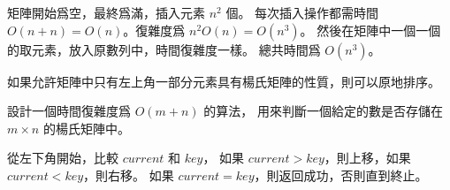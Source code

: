 \startANSWER
矩陣開始爲空，最終爲滿，插入元素 $n^2$ 個。
每次插入操作都需時間 $O(n+n)=O(n)$。復雜度爲 $n^2 O(n)=O(n^3)$。
然後在矩陣中一個一個的取元素，放入原數列中，時間復雜度一樣。
總共時間爲 $O(n^3)$。

如果允許矩陣中只有左上角一部分元素具有楊氏矩陣的性質，則可以原地排序。
\stopANSWER

\startigBase[continue]\startitem
設計一個時間復雜度爲 $O(m+n)$ 的算法，
用來判斷一個給定的數是否存儲在 $m\times n$ 的楊氏矩陣中。
\stopitem\stopigBase

\startANSWER
從左下角開始，比較 $current$ 和 $key$，
如果 $current > key$，則上移，如果 $current < key$，則右移。
如果 $current = key$，則返回成功，否則直到終止。
\stopANSWER

\stopPROBLEM

